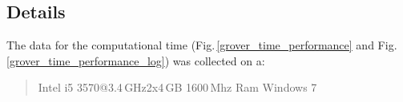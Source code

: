 \documentclass[bibliography=totocnumbered, 10pt]{article}
\theoremstyle{NoticeStyle}
\begin{document}
\subsection{Details}
The data for the computational time (Fig.\,\ref{grover_time_performance} and Fig.\,\ref{grover_time_performance_log}) was collected on a:

\begin{quotation}
	Intel i5 3570@3.4\,GHz\quad\quad 2x4\,GB 1600\,Mhz Ram \quad\quad Windows 7
\end{quotation}

	


%

\newpage

{}

\nocite{Perry2012}
\nocite{BasicConceptsQC}

\label{sec:References}


\end{document}
